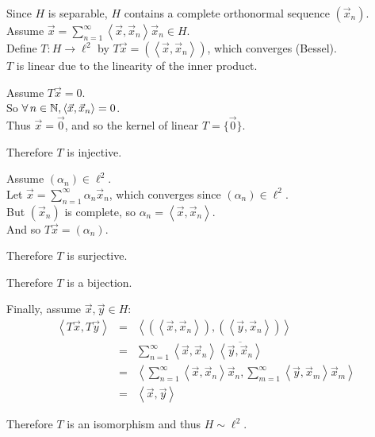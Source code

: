 \documentclass[letterpaper,12pt,fleqn]{article}
\newcommand{\vx}{\vec{x}}
\newcommand{\vy}{\vec{y}}
\newcommand{\vo}{\vec{0}}
\renewcommand{\a}{\alpha}
\newcommand{\inner}[1]{\left<#1\right>}
\newcommand{\conj}[1]{\overline{#1}}
\begin{document}
\begin{theproof}
  Since $H$ is separable, $H$ contains a complete orthonormal sequence
  $(\vx_n)$. \\
  Assume $\vx=\sum_{n=1}^{\infty}\inner{\vx,\vx_n}\vx_n\in H$. \\
  Define $T:H\to\ell^2$ by $T\vx=(\inner{\vx,\vx_n})$, which
  converges (Bessel). \\

  $T$ is linear due to the linearity of the inner product.

  Assume $T\vx=0$. \\
  So $\forall\,n\in\N,\inner{\vx,\vx_n}=0$. \\
  Thus $\vx=\vo$, and so the kernel of linear $T=\{\vo\}$.

  Therefore $T$ is injective.

  Assume $(\a_n)\in\ell^2$. \\
  Let $\vx=\sum_{n=1}^{\infty}\a_n\vx_n$, which converges since
  $(\a_n)\in\ell^2$. \\
  But $(\vx_n)$ is complete, so $\a_n=\inner{\vx,\vx_n}$. \\
  And so $T\vx=(\a_n)$.

  Therefore $T$ is surjective.

  Therefore $T$ is a bijection.

  Finally, assume $\vx,\vy\in H$:
  \begin{eqnarray*}
    \inner{T\vx,T\vy} &=& \inner{(\inner{\vx,\vx_n}),(\inner{\vy,\vx_n})} \\
    &=& \sum_{n=1}^{\infty}\inner{\vx,\vx_n}\conj{\inner{\vy,\vx_n}} \\
    &=& \inner{\sum_{n=1}^{\infty}\inner{\vx,\vx_n}\vx_n,
      \sum_{m=1}^{\infty}\inner{\vy,\vx_m}\vx_m} \\
    &=& \inner{\vx,\vy}
  \end{eqnarray*}

  Therefore $T$ is an isomorphism and thus $H\sim\ell^2$.
\end{theproof}
\end{document}
